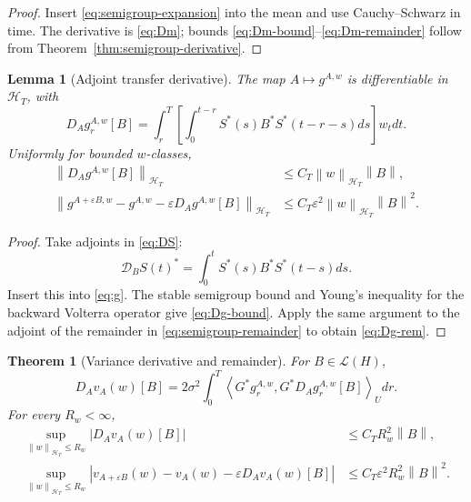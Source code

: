 \documentclass[11pt]{article}
\newtheorem{theorem}[assumption]{Theorem}
\newtheorem{lemma}[assumption]{Lemma}
\theoremstyle{remark}
\newcommand{\cL}{\mathcal L}
\newcommand{\cH}{\mathcal H_T}
\newcommand{\ip}[2]{\left\langle #1,#2\right\rangle}
\newcommand{\norm}[1]{\left\lVert #1\right\rVert}
\newcommand{\abs}[1]{\left\lvert #1\right\rvert}
\begin{document}
\begin{proof}
Insert \eqref{eq:semigroup-expansion} into the mean and use Cauchy--Schwarz in time. The derivative is \eqref{eq:Dm}; bounds \eqref{eq:Dm-bound}--\eqref{eq:Dm-remainder} follow from Theorem~\ref{thm:semigroup-derivative}.
\end{proof}

\begin{lemma}[Adjoint transfer derivative]\label{lem:g-derivative}
The map $A\mapsto g^{A,w}$ is differentiable in $\cH$, with
\begin{equation}\label{eq:Dg}
 D_Ag_r^{A,w}[B]
 =
 \int_r^T
 \left[
 \int_0^{t-r}
 S^*(s)B^*S^*(t-r-s)ds
 \right]w_tdt.
\end{equation}
Uniformly for bounded $w$-classes,
\begin{align}
 \norm{D_Ag^{A,w}[B]}_{\cH}
 &\le C_T\norm{w}_{\cH}\norm{B},
 \label{eq:Dg-bound}\\
 \norm{
 g^{A+\varepsilon B,w}-g^{A,w}
 -\varepsilon D_Ag^{A,w}[B]
 }_{\cH}
 &\le C_T\varepsilon^2\norm{w}_{\cH}\norm{B}^2.
 \label{eq:Dg-rem}
\end{align}
\end{lemma}

\begin{proof}
Take adjoints in \eqref{eq:DS}:
\[
 \mathcal D_BS(t)^*
 =
 \int_0^tS^*(s)B^*S^*(t-s)ds.
\]
Insert this into \eqref{eq:g}. The stable semigroup bound and Young's inequality for the backward Volterra operator give \eqref{eq:Dg-bound}. Apply the same argument to the adjoint of the remainder in \eqref{eq:semigroup-remainder} to obtain \eqref{eq:Dg-rem}.
\end{proof}

\begin{theorem}[Variance derivative and remainder]\label{thm:variance-derivative}
For $B\in\cL(H)$,
\begin{equation}\label{eq:Dv}
 D_Av_A(w)[B]
 =
 2\sigma^2\int_0^T
 \ip{
 G^*g_r^{A,w}
 }{
 G^*D_Ag_r^{A,w}[B]
 }_Udr.
\end{equation}
For every $R_w<\infty$,
\begin{align}
 \sup_{\norm{w}_{\cH}\le R_w}
 \abs{D_Av_A(w)[B]}
 &\le C_TR_w^2\norm{B},
 \label{eq:Dv-bound}\\
 \sup_{\norm{w}_{\cH}\le R_w}
 \abs{
 v_{A+\varepsilon B}(w)-v_A(w)
 -\varepsilon D_Av_A(w)[B]
 }
 &\le C_T\varepsilon^2R_w^2\norm{B}^2.
 \label{eq:Dv-rem}
\end{align}
\end{theorem}
\end{document}
